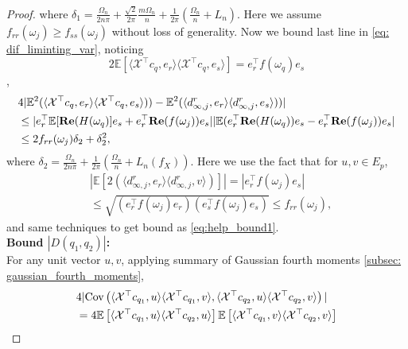 \begin{proof}
where $\delta_1 =  \frac{\Omega_n}{2n\pi}+\frac{\sqrt{2}}{2\pi}\frac{m\Omega_n}{n}+ \frac{1}{2\pi}\left(\frac{\Omega_n}{n} + L_n\right)$. Here we assume $f_{rr}(\omega_j)\geq f_{ss}(\omega_j)$ without loss of generality. 
Now we bound last line in \eqref{eq: dif_liminting_var}, noticing 
\[
2\mathbb{E}[\langle \mathcal{X}^\top  c_{q}, e_r\rangle\langle \mathcal{X}^\top  c_{q}, e_s\rangle] = e_r^\top  f(\omega_q)e_s
\], 
\begin{equation}
\begin{aligned}
&4|\mathbb{E}^2(\langle \mathcal{X}^\top  c_q,e_r\rangle \langle \mathcal{X}^\top  c_q,e_s\rangle) )-\mathbb{E}^2(\langle d^{r}_{\infty, j},e_r\rangle \langle d^{r}_{\infty, j},e_s\rangle) )|\\
&\le | e_r^\top  \mathbb{E}[{\bf Re}(H(\omega_q)]e_s+e_r^\top  {\bf Re}(f(\omega_j))e_s||\mathbb{E} (e_r^\top  {\bf Re}(H(\omega_q))e_s-e_r^\top  {\bf Re}(f(\omega_j))e_s|\\
&\le 2f_{rr}(\omega_j)\delta_2+\delta_2^2,
\end{aligned}
\end{equation}
where $\delta_2= \frac{\Omega_n}{2n\pi}+ \frac{1}{2\pi}\left(\frac{\Omega_n}{n} + L_n(f_X)\right)$. Here we use the fact that for $u, v\in E_p$, 
\begin{equation}
\begin{aligned}
&|\mathbb{E} [2(\langle d^{r}_{\infty, j},e_r\rangle \langle d^{r}_{\infty, j},v\rangle)]|  = |e_r^\top  f(\omega_j)e_s|\\
&\le \sqrt{(e_r^\top  f(\omega_j)e_r)(e_s^\top  f(\omega_j)e_s)}\le f_{rr}(\omega_j), 
\end{aligned}
\end{equation}
and same techniques to get bound as \eqref{eq:help_bound1}. \\[0.2cm]
{\bf Bound $|D(q_1,q_2)|$:}\\
For any unit vector $u,v$, applying summary of Gaussian fourth moments \ref{subsec: gaussian_fourth_moments}, 
\begin{equation}
\begin{aligned}
&4|\cov\left(\langle \mathcal{X}^\top  c_{q_1}, u \rangle  \langle \mathcal{X}^\top  c_{q_1}, v \rangle ,  \langle \mathcal{X}^\top  c_{q_2}, u \rangle  \langle \mathcal{X}^\top  c_{q_2}, v \rangle\right)| \\
&= 4\mathbb{E} \left[ \langle \mathcal{X}^\top  c_{q_1}, u \rangle  \langle \mathcal{X}^\top  c_{q_2}, u \rangle \right] \mathbb{E} \left[ \langle \mathcal{X}^\top  c_{q_1}, v \rangle  \langle \mathcal{X}^\top  c_{q_2}, v \rangle \right]\\

\end{aligned}
\end{equation}
\end{proof}
